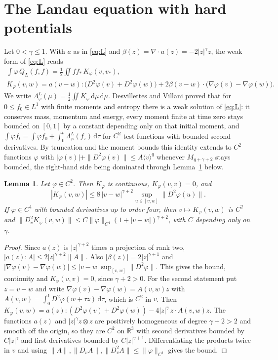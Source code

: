 \documentclass[11pt]{amsart}
\newtheorem{lemma}[theorem]{Lemma}
\theoremstyle{definition}
\newcommand{\RR}{\mathbb{R}}
\newcommand{\dd}{\,\mathrm{d}}
\newcommand{\jb}[1]{\langle #1\rangle}
\begin{document}
\section{The Landau equation with hard potentials}\label{sec:landau}

Let $0<\gamma\le1$. With $a$ as in \eqref{eq:L} and $\beta(z)=\nabla\cdot a(z)=-2|z|^\gamma z$, the weak form of \eqref{eq:L} reads \cite[Chap.~1]{Vil02}
\begin{equation}\label{eq:weakL}
\begin{gathered}\int\varphi\,Q_L(f,f)=\frac12\iint ff_*\,K_\varphi(v,v_*),\\
K_\varphi(v,w)=a(v-w):\big(D^2\varphi(v)+D^2\varphi(w)\big)+2\beta(v-w)\cdot\big(\nabla\varphi(v)-\nabla\varphi(w)\big).\end{gathered}
\end{equation}
We write $\Lambda^L_\varphi(\mu)=\frac12\iint K_\varphi\dd\mu\dd\mu$. Desvillettes and Villani \cite{DV00} proved that for $0\le f_0\in L^1$ with finite moments and entropy there is a weak solution of \eqref{eq:L}: it conserves mass, momentum and energy, every moment finite at time zero stays bounded on $[0,1]$ by a constant depending only on that initial moment, and $\int\varphi f_t=\int\varphi f_0+\int_0^t\Lambda^L_\varphi(f_\tau)\dd\tau$ for $C^2$ test functions with bounded second derivatives. By truncation and the moment bounds this identity extends to $C^2$ functions $\varphi$ with $|\varphi(v)|+\|D^2\varphi(v)\|\le A\jb{v}^q$ whenever $M_{q+\gamma+2}$ stays bounded, the right-hand side being dominated through Lemma~\ref{lem:K} below.

\begin{lemma}\label{lem:K}
Let $\varphi\in C^2$. Then $K_\varphi$ is continuous, $K_\varphi(v,v)=0$, and
\[
|K_\varphi(v,w)|\le8\,|v-w|^{\gamma+2}\sup_{u\in[v,w]}\|D^2\varphi(u)\| .
\]
If $\varphi\in C^4$ with bounded derivatives up to order four, then $v\mapsto K_\varphi(v,w)$ is $C^2$ and $\|D_v^2K_\varphi(v,w)\|\le C\|\varphi\|_{C^4}(1+|v-w|)^{\gamma+2}$, with $C$ depending only on $\gamma$.
\end{lemma}

\begin{proof}
Since $a(z)$ is $|z|^{\gamma+2}$ times a projection of rank two, $|a(z):A|\le2|z|^{\gamma+2}\|A\|$. Also $|\beta(z)|=2|z|^{\gamma+1}$ and $|\nabla\varphi(v)-\nabla\varphi(w)|\le|v-w|\sup_{[v,w]}\|D^2\varphi\|$. This gives the bound, continuity and $K_\varphi(v,v)=0$, since $\gamma+2>0$. For the second statement put $z=v-w$ and write $\nabla\varphi(v)-\nabla\varphi(w)=A(v,w)z$ with $A(v,w)=\int_0^1D^2\varphi(w+\tau z)\dd\tau$, which is $C^2$ in $v$. Then $K_\varphi(v,w)=a(z):(D^2\varphi(v)+D^2\varphi(w))-4|z|^\gamma\,z\cdot A(v,w)z$. The functions $a(z)$ and $|z|^\gamma z\otimes z$ are positively homogeneous of degree $\gamma+2>2$ and smooth off the origin, so they are $C^2$ on $\RR^3$ with second derivatives bounded by $C|z|^\gamma$ and first derivatives bounded by $C|z|^{\gamma+1}$. Differentiating the products twice in $v$ and using $\|A\|,\|D_vA\|,\|D_v^2A\|\le\|\varphi\|_{C^4}$ gives the bound.
\end{proof}
\end{document}
